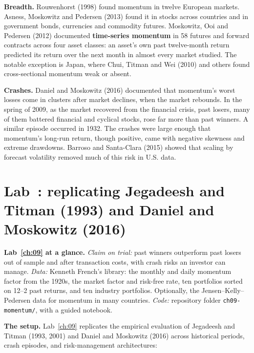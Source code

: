 \textbf{Breadth.} Rouwenhorst (1998) found momentum in twelve European markets. Asness, Moskowitz and Pedersen (2013) found it in stocks across countries and in government bonds, currencies and commodity futures. Moskowitz, Ooi and Pedersen (2012) documented \textbf{time-series momentum} in 58 futures and forward contracts across four asset classes: an asset's own past twelve-month return predicted its return over the next month in almost every market studied. The notable exception is Japan, where Chui, Titman and Wei (2010) and others found cross-sectional momentum weak or absent.

\textbf{Crashes.} Daniel and Moskowitz (2016) documented that momentum's worst losses come in clusters after market declines, when the market rebounds. In the spring of 2009, as the market recovered from the financial crisis, past losers, many of them battered financial and cyclical stocks, rose far more than past winners. A similar episode occurred in 1932. The crashes were large enough that momentum's long-run return, though positive, came with negative skewness and extreme drawdowns. Barroso and Santa-Clara (2015) showed that scaling by forecast volatility removed much of this risk in U.S. data.

\section{Lab~\thechapter: replicating Jegadeesh and Titman (1993) and Daniel and Moskowitz (2016)}
\label{sec:09-lab}

\begin{callout}
\textbf{Lab~\ref{ch:09} at a glance.} \emph{Claim on trial:} past winners outperform past losers out of sample and after transaction costs, with crash risks an investor can manage. \emph{Data:} Kenneth French's library: the monthly and daily momentum factor from the 1920s, the market factor and risk-free rate, ten portfolios sorted on 12--2 past returns, and ten industry portfolios. Optionally, the Jensen--Kelly--Pedersen data for momentum in many countries. \emph{Code:} repository folder \texttt{ch09-momentum/}, with a guided notebook.
\end{callout}

\textbf{The setup.} Lab~\ref{ch:09} replicates the empirical evaluation of Jegadeesh and Titman (1993, 2001) and Daniel and Moskowitz (2016) across historical periods, crash episodes, and risk-management architectures:

